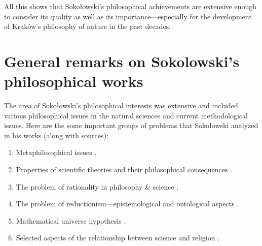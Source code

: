 \documentclass[%
  manuscript=article,
  year=2024,
  volume=77,
  doi=10.59203/zfn.77.689,
]{zfn}
\begin{document}
All this shows that Sokołowski's philosophical achievements are extensive enough to consider its quality as well as its importance---especially for the development of Kraków's philosophy of nature in the past decades.



\section{General remarks on Sokolowski's philosophical works }

The area of Sokołowski's philosophical interests was extensive and included various philosophical issues in the natural sciences and current methodological issues. Here are the some important groups of problems that Sokołowski analyzed in his works (along with sources):



\begin{enumerate}[label=\alph*.]

\item Metaphilosophical issues 
\parencites[numerous remarks in:][]{Sokoowski1986Pluralizm}[][]{Sokoowski1989Gos}[][]{Sokoowski1990Nadwyzkowosc}[][]{Sokoowski2014Czy}[][]{Sokoowski2017Kopoty}.%


\item Properties of scientific theories and their philosophical consequences 
\parencites[][]{Sokoowski1978Czy}[][]{Sokoowski1983Jezyk}[][]{Sokoowski1986Pluralizm}[][]{Sokoowski1987Alberta}[][]{Sokoowski1989Gos}[][]{Sokoowski1994Wszechswiat}[][]{Sokoowski2000Czas}[][]{Sokoowski2006Teorie}[][]{Sokoowski2007Czowiek}[][]{Sokoowski2008Czego}[][]{Sokoowski2014Czy}[][]{Sokoowski2015Granice}[][]{Sokoowski2017Kopoty}.%


\item The problem of rationality in philosophy \& science 
\parencites[][]{Sokoowski2006Alicja}[][]{Sokoowski2011O}.%


\item The problem of reductionism---epistemological and ontological aspects 
\parencites[][]{Sokoowski1996W}[][]{Sokoowski1999Maa}[][]{Sokoowski2001Wspoczesne}.%


\item Mathematical universe hypothesis 
\parencites[][]{Sokoowski1990Nadwyzkowosc}[][]{Sokoowski2011O}[][]{Sokoowski2011Pare}[][]{Sokoowski2015Co}.%


\item Selected aspects of the relationship between science and religion 
\parencites[][]{Sokoowski1991Posowie}[][]{Sokoowski1993Koscio}[][]{Sokoowski2001Wspoczesne}[][]{Sokoowski2011O}[][]{Sokoowski2014Czy}.%


\end{enumerate}
\end{document}
